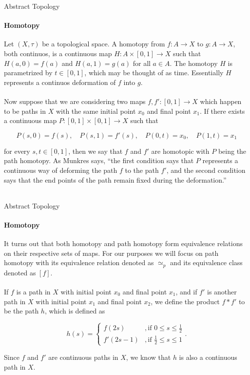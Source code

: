 \documentclass[pdf]{beamer}
\begin{document}
    \begin{frame}{Abstract Topology}
        \framesubtitle{Homotopy}

        Let $(X, \tau)$ be a topological space. A {\color{red} homotopy} from $f: A \to X$ to $g: A \to X$,
        both continuos, is a continuous map $H: A \times [0, 1] \to X$ such that $H(a, 0)
        = f(a)$ and $H(a, 1) = g(a)$ for all $a \in A$. The homotopy $H$ is parametrized by 
        $t \in [0, 1]$, which may be thought of as time. Essentially $H$ represents a continuos
        deformation of $f$ into $g$. \\~\\

        Now suppose that we are considering two maps $f, f': [0, 1] \to X$ which happen
        to be paths in $X$ with the same initial point $x_0$ and final point $x_1$.
        If there exists a continuous map $P: [0, 1] \times [0, 1] \to X$ such that 

        $$
            P(s, 0) = f(s), \quad P(s, 1) = f'(s), \quad P(0, t) = x_0, \quad P(1, t) = x_1 \nonumber
        $$

        for every $s, t \in [0, 1]$, then we say that $f$ and $f'$ are {\color{red} homotopic}
        with $P$ being the {\color{red} path homotopy}. As Munkres says, ``the first condition
        says that $P$ represents a continuous way of deforming the path $f$ to the path
        $f'$, and the second condition says that the end points of the path remain fixed
        during the deformation.'' \\~\\

    \end{frame}

    \begin{frame}{Abstract Topology}
        \framesubtitle{Homotopy}

        It turns out that both homotopy and path homotopy form equivalence relations on their 
        respective sets of maps. For our purposes we will focus on path homotopy with its 
        equivalence relation denoted as $\simeq_p$ and its equivalence class denoted as $[f]$. \\~\\

        If $f$ is a path in $X$ with initial point $x_0$ and final point $x_1$, and if $f'$
        is another path in $X$ with initial point $x_1$ and final point $x_2$, we define the
        {\color{red} product} $f * f'$ to be the path $h$, which is defined  as

        $$h(s) =
        \begin{cases}
            f(2s) &, \text{if } 0 \leq s \leq \frac{1}{2} \\
            f'(2s - 1) &, \text{if } \frac{1}{2} \leq s \leq 1
        \end{cases}.
        $$

        Since $f$ and $f'$ are continuous paths in $X$, we know that $h$ is also a continuous path in $X$. \\~\\

    \end{frame}
\end{document}
